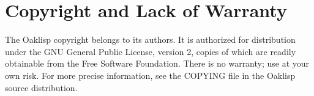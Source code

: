 \section{Copyright and Lack of Warranty}

The Oaklisp copyright belongs to its authors.  It is authorized for
distribution under the GNU General Public License, version 2, copies
of which are readily obtainable from the Free Software Foundation.
There is no warranty; use at your own risk.  For more precise
information, see the COPYING file in the Oaklisp source distribution.
